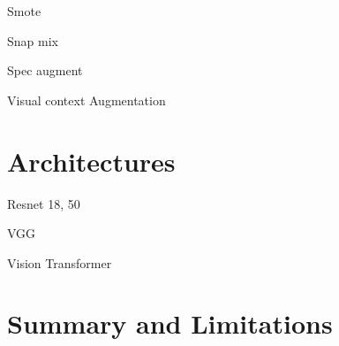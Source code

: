 Smote

Snap mix

Spec augment

Visual context Augmentation

\section{Architectures}
Resnet 18, 50

VGG

Vision Transformer

\section{Summary and Limitations}